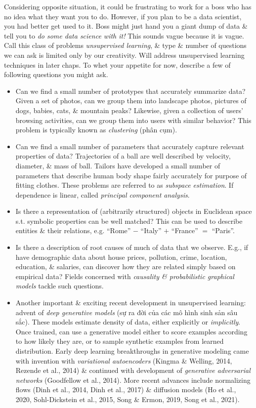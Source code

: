 \documentclass{article}
\begin{document}
\begin{enumerate}
\begin{itemize}
\begin{itemize}
\begin{itemize}
				Considering opposite situation, it could be frustrating to work for a boss who has no idea what they want you to do. However, if you plan to be a data scientist, you had better get used to it. Boss might just hand you a giant dump of data \& tell you to {\it do some data science with it!} This sounds vague because it is vague. Call this class of problems {\it unsupervised learning}, \& type \& number of questions we can ask is limited only by our creativity. Will address unsupervised learning techniques in later chaps. To whet your appetite for now, describe a few of following questions you might ask.
				\begin{itemize}
					\item Can we find a small number of prototypes that accurately summarize data? Given a set of photos, can we group them into landscape photos, pictures of dogs, babies, cats, \& mountain peaks? Likewise, given a collection of users' browsing activities, can we group them into users with similar behavior? This problem is typically known as {\it clustering} (phân cụm).
					\item Can we find a small number of parameters that accurately capture relevant properties of data? Trajectories of a ball are well described by velocity, diameter, \& mass of ball. Tailors have developed a small number of parameters that describe human body shape fairly accurately for purpose of fitting clothes. These problems are referred to as {\it subspace estimation}. If dependence is linear, called {\it principal component analysis}.
					\item Is there a representation of (arbitrarily structured) objects in Euclidean space s.t. symbolic properties can be well matched? This can be used to describe entities \& their relations, e.g. ``Rome'' $-$ ``Italy'' $+$ ``France'' $=$ ``Paris''.
					\item Is there a description of root causes of much of data that we observe. E.g., if have demographic data about house prices, pollution, crime, location, education, \& salaries, can discover how they are related simply based on empirical data? Fields concerned with {\it causality \& probabilistic graphical models} tackle such questions.
					\item Another important \& exciting recent development in unsupervised learning: advent of {\it deep generative models} (sự ra đời của các mô hình sinh sản sâu sắc). These models estimate density of data, either explicitly or {\it implicitly}. Once trained, can use a generative model either to score examples according to how likely they are, or to sample synthetic examples from learned distribution. Early deep learning breakthroughs in generative modeling came with invention with {\it variational autoencoders} (Kingma \& Welling, 2014, Rezende et al., 2014) \& continued with development of {\it generative adversarial networks} (Goodfellow et al., 2014). More recent advances include normalizing flows (Dinh et al., 2014, Dinh et al., 2017) \& diffusion models (Ho et al., 2020,  Sohl-Dickstein et al., 2015, Song \& Ermon, 2019, Song et al., 2021).

\end{itemize}
\end{itemize}
\end{itemize}
\end{itemize}
\end{enumerate}
\end{document}
